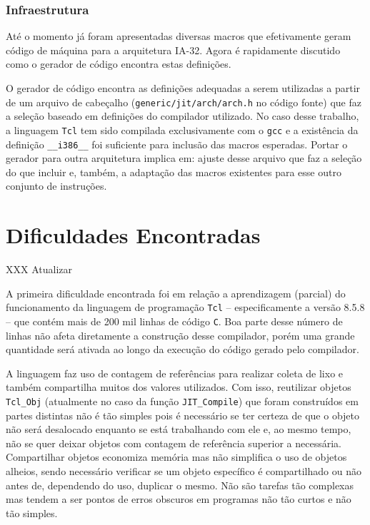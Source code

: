 \subsubsection{Infraestrutura}

Até o momento já foram apresentadas diversas macros que efetivamente
geram código de máquina para a arquitetura IA-32. Agora é rapidamente
discutido como o gerador de código encontra estas definições.

O gerador de código encontra as definições adequadas a serem
utilizadas a partir de um arquivo de cabeçalho
(\verb!generic/jit/arch/arch.h! no código fonte) que faz a seleção
baseado em definições do compilador utilizado. No caso desse trabalho,
a linguagem \texttt{Tcl} tem sido compilada exclusivamente com o
\texttt{gcc} e a existência da definição \verb!__i386__! foi
suficiente para inclusão das macros esperadas. Portar o gerador para
outra arquitetura implica em: ajuste desse arquivo que faz a seleção do
que incluir e, também, a adaptação das macros existentes para esse outro
conjunto de instruções.

%


\section{Dificuldades Encontradas}

XXX Atualizar

A primeira dificuldade encontrada foi em relação a aprendizagem
(parcial) do funcionamento da linguagem de programação \texttt{Tcl} --
especificamente a versão 8.5.8 --
que contém mais de 200 mil linhas de código \texttt{C}. Boa parte
desse número de linhas não afeta diretamente a construção desse
compilador, porém uma grande quantidade será ativada
ao longo da execução do código gerado pelo compilador.

A linguagem faz uso de contagem de referências para realizar coleta de
lixo e também compartilha muitos dos valores utilizados. Com isso,
reutilizar objetos \verb!Tcl_Obj! (atualmente no caso da função
\verb!JIT_Compile!) que foram construídos em partes distintas não é tão
simples pois é necessário se ter certeza de que o objeto não será
desalocado enquanto se está trabalhando com ele e, ao mesmo tempo, não
se quer deixar objetos com contagem de referência superior a
necessária. Compartilhar objetos economiza memória mas não simplifica
o uso de objetos alheios, sendo necessário verificar se um objeto
específico é compartilhado ou não antes de, dependendo do uso,
duplicar o mesmo. Não são tarefas tão complexas mas tendem a ser
pontos de erros obscuros em programas não tão curtos e não tão simples.

